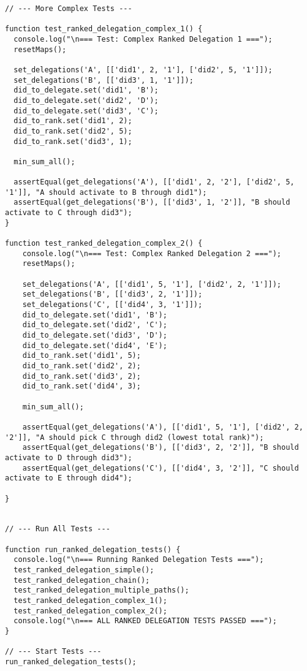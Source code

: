 \begin{verbatim}
// --- More Complex Tests ---

function test_ranked_delegation_complex_1() {
  console.log("\n=== Test: Complex Ranked Delegation 1 ===");
  resetMaps();

  set_delegations('A', [['did1', 2, '1'], ['did2', 5, '1']]);
  set_delegations('B', [['did3', 1, '1']]);
  did_to_delegate.set('did1', 'B');
  did_to_delegate.set('did2', 'D');
  did_to_delegate.set('did3', 'C');
  did_to_rank.set('did1', 2);
  did_to_rank.set('did2', 5);
  did_to_rank.set('did3', 1);

  min_sum_all();

  assertEqual(get_delegations('A'), [['did1', 2, '2'], ['did2', 5, '1']], "A should activate to B through did1");
  assertEqual(get_delegations('B'), [['did3', 1, '2']], "B should activate to C through did3");
}

function test_ranked_delegation_complex_2() {
    console.log("\n=== Test: Complex Ranked Delegation 2 ===");
    resetMaps();

    set_delegations('A', [['did1', 5, '1'], ['did2', 2, '1']]);
    set_delegations('B', [['did3', 2, '1']]);
    set_delegations('C', [['did4', 3, '1']]);
    did_to_delegate.set('did1', 'B');
    did_to_delegate.set('did2', 'C');
    did_to_delegate.set('did3', 'D');
    did_to_delegate.set('did4', 'E');
    did_to_rank.set('did1', 5);
    did_to_rank.set('did2', 2);
    did_to_rank.set('did3', 2);
    did_to_rank.set('did4', 3);

    min_sum_all();

    assertEqual(get_delegations('A'), [['did1', 5, '1'], ['did2', 2, '2']], "A should pick C through did2 (lowest total rank)");
    assertEqual(get_delegations('B'), [['did3', 2, '2']], "B should activate to D through did3");
    assertEqual(get_delegations('C'), [['did4', 3, '2']], "C should activate to E through did4");

}
  

// --- Run All Tests ---

function run_ranked_delegation_tests() {
  console.log("\n=== Running Ranked Delegation Tests ===");
  test_ranked_delegation_simple();
  test_ranked_delegation_chain();
  test_ranked_delegation_multiple_paths();
  test_ranked_delegation_complex_1();
  test_ranked_delegation_complex_2();
  console.log("\n=== ALL RANKED DELEGATION TESTS PASSED ===");
}

// --- Start Tests ---
run_ranked_delegation_tests();

\end{verbatim}


